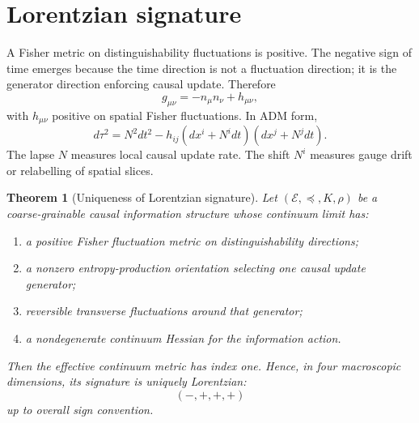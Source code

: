 \documentclass[11pt]{article}
\newtheorem{theorem}[definition]{Theorem}
\begin{document}
\section{Lorentzian signature}

A Fisher metric on distinguishability fluctuations is positive. The negative sign of time emerges because the time direction is not a fluctuation direction; it is the generator direction enforcing causal update. Therefore
\begin{equation}
 g_{\mu\nu}=-n_\mu n_\nu+h_{\mu\nu},
\end{equation}
with $h_{\mu\nu}$ positive on spatial Fisher fluctuations.
In ADM form,
\begin{equation}
 d\tau^2=N^2dt^2-h_{ij}(dx^i+N^idt)(dx^j+N^jdt).
\end{equation}
The lapse $N$ measures local causal update rate. The shift $N^i$ measures gauge drift or relabelling of spatial slices.


\begin{theorem}[Uniqueness of Lorentzian signature]
Let $(\mathcal E,\preceq,K,\rho)$ be a coarse-grainable causal information structure whose continuum limit has:
\begin{enumerate}[label=(\roman*)]
\item a positive Fisher fluctuation metric on distinguishability directions;
\item a nonzero entropy-production orientation selecting one causal update generator;
\item reversible transverse fluctuations around that generator;
\item a nondegenerate continuum Hessian for the information action.
\end{enumerate}
Then the effective continuum metric has index one. Hence, in four macroscopic dimensions, its signature is uniquely Lorentzian:
\[
(-,+,+,+)
\]
up to overall sign convention.
\end{theorem}
\end{document}
